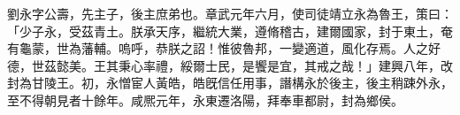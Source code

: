 
\begin{pinyinscope}
劉永字公壽，先主子，後主庶弟也。章武元年六月，使司徒靖立永為魯王，策曰：「少子永，受茲青土。朕承天序，繼統大業，遵脩稽古，建爾國家，封于東土，奄有龜蒙，世為藩輔。嗚呼，恭朕之詔！惟彼魯邦，一變適道，風化存焉。人之好德，世茲懿美。王其秉心率禮，綏爾士民，是饗是宜，其戒之哉！」建興八年，改封為甘陵王。初，永憎宦人黃皓，皓旣信任用事，譖構永於後主，後主稍踈外永，至不得朝見者十餘年。咸熈元年，永東遷洛陽，拜奉車都尉，封為鄉侯。


\end{pinyinscope}